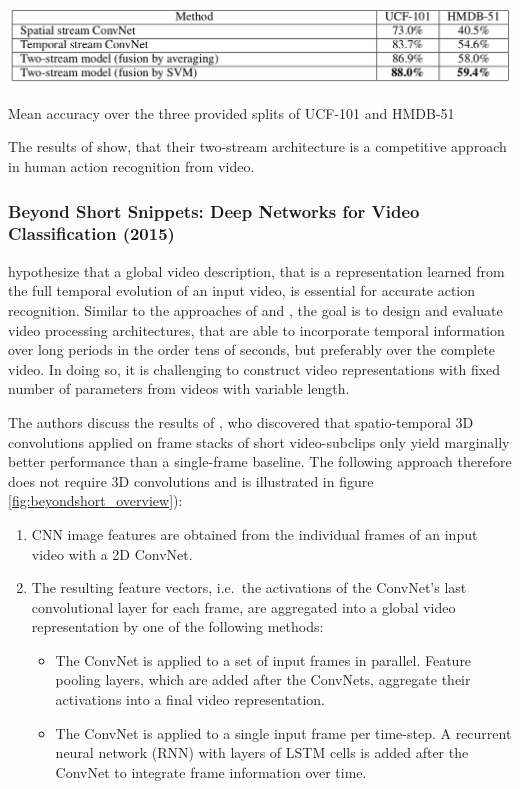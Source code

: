 \begin{table}[H]
    \centering
    \includegraphics[width=\textwidth]{img_deep/twostream_results}
    \caption{Mean accuracy over the three provided splits of UCF-101 and HMDB-51 \cite{simonyan_two-stream_2014}}
    \label{tab:twostream_results}
\end{table}

The results of \textcite{simonyan_two-stream_2014} show, that their two-stream architecture is a competitive approach in human action recognition from video.


\subsubsection{Beyond Short Snippets: Deep Networks for Video Classification (2015)}

\textcite{ng_beyond_2015} hypothesize that a global video description, that is a representation learned from the full temporal evolution of an input video, is essential for accurate action recognition.
Similar to the approaches of \textcite{baccouche_sequential_2011} and \textcite{varol_long-term_2016}, the goal is to design and evaluate video processing architectures, that are able to incorporate temporal information over long periods in the order tens of seconds, but preferably over the complete video.
In doing so, it is challenging to construct video representations with fixed number of parameters from videos with variable length.

The authors discuss the results of \textcite{karpathy_large-scale_2014}, who discovered that spatio-temporal 3D convolutions applied on frame stacks of short video-subclips only yield marginally better performance than a single-frame baseline.
The following approach therefore does not require 3D convolutions and is illustrated in figure \ref{fig:beyondshort_overview}):

\begin{enumerate}
    \item CNN image features are obtained from the individual frames of an input video with a 2D ConvNet.
    \item The resulting feature vectors, i.e.\ the activations of the ConvNet's last convolutional layer for each frame, are aggregated into a global video representation by one of the following methods:
    \begin{itemize}
        \item The ConvNet is applied to a set of input frames in parallel. Feature pooling layers, which are added after the ConvNets, aggregate their activations into a final video representation.
        \item The ConvNet is applied to a single input frame per time-step. A recurrent neural network (RNN) with layers of LSTM cells \cite{hochreiter_long_1997} is added after the ConvNet to integrate frame information over time.
    \end{itemize}
\end{enumerate}

